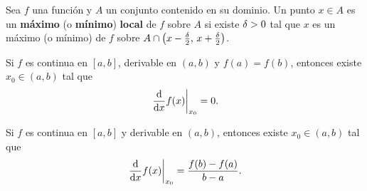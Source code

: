 \begin{definicion}
  \label{def:extremo_local}
  Sea $f$ una funci\'on y $A$ un conjunto contenido en su dominio. Un punto
  $x\in A$ es un \textbf{m\'aximo} (o \textbf{m\'inimo}) \textbf{local} de $f$
  sobre $A$ si existe $\delta>0$ tal que $x$ es un m\'aximo (o m\'inimo) de $f$
  sobre $A\cap\left( x-\tfrac{\delta}{2},\,x+\tfrac{\delta}{2} \right)$.
\end{definicion}

\begin{teorema}[Rolle]
  \label{teo:rolle}
  Si $f$ es continua en $[a,b]$, derivable en $(a,b)$ y $f(a)=f(b)$, entonces
  existe $x_0\in(a,b)$ tal que
  \begin{equation}
    \label{eq:rolle}
    \left. \frac{\mathrm{d}}{\mathrm{d}x}f(x) \right|_{x_0}=0 .
  \end{equation}
\end{teorema}

\begin{teorema}
  \label{teo:valor_medio}
  Si $f$ es continua en $[a,b]$ y derivable en $(a,b)$, entonces existe
  $x_0\in(a,b)$ tal que
  \begin{equation}
    \label{eq:valor_medio}
    \left. \frac{\mathrm{d}}{\mathrm{d}x}f(x) \right|_{x_0}=\frac{f(b)-f(a)}{b-a}.
  \end{equation}
\end{teorema}
